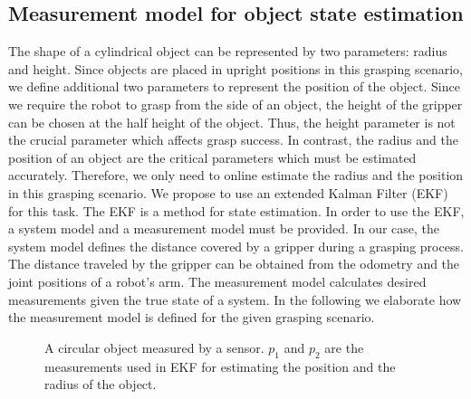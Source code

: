 \subsection{Measurement model for object state estimation} 
The shape of a cylindrical object can be represented by two parameters: radius and height. Since objects are placed in upright positions in this grasping scenario, we define additional two parameters to represent the position of the object. Since we require the robot to grasp from the side of an object, the height of the gripper can be chosen at the half height of the object. Thus, the height parameter is not the crucial parameter which affects grasp success. In contrast, the radius and the position of an object are the critical parameters which must be estimated accurately. Therefore, we only need to online estimate the radius and the position in this grasping scenario. We propose to use an extended Kalman Filter (EKF) for this task. The EKF is a method for state estimation. In order to use the EKF, a system model and a measurement model must be provided. In our case, the system model defines the distance covered by a gripper during a grasping process. The distance traveled by the gripper can be obtained from the odometry and the joint positions of a  robot's arm. The measurement model calculates desired measurements given the true state of a system. In the following we elaborate how the measurement model is defined for the given grasping scenario. 

\begin{figure}[!htbp]
\centering
\def\svgwidth{0.7\linewidth} 

\captionsetup{justification=raggedright}
\caption{A circular object measured by a sensor. $p_1$ and $p_2$ are the measurements used in EKF for estimating the position and the radius of the object.}
\label{fig:illustrate_measurement_model}
\end{figure}	

